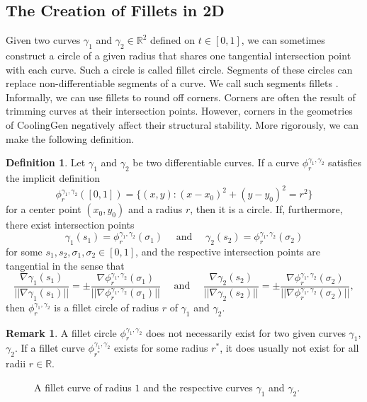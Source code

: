 \documentclass[a4paper, 11pt]{report}
\theoremstyle{definition}
\newtheorem{definition}{Definition}[section]
\newtheorem*{remark}{Remark}
\begin{document}
\subsection{The Creation of Fillets in 2D}\label{sec:filletcurves}
	Given two curves $\gamma_1$ and $\gamma_2 \in \mathbb{R}^2$ defined on $t \in [0,1]$, we can sometimes construct a circle of a given radius that shares one tangential intersection point with each curve. Such a circle is called fillet circle. Segments of these circles can replace non-differentiable segments of a curve. We call such segments fillets \cite{Sorby2016}. Informally, we can use fillets to round off corners. Corners are often the result of trimming curves at their intersection points. However, corners in the geometries of CoolingGen negatively affect their structural stability. More rigorously, we can make the following definition.

	\begin{definition}\label{def:filletcircle}
		Let $\gamma_1$ and $\gamma_2$ be two differentiable curves.
		If a curve $\phi^{\gamma_1, \gamma_2}_r$ satisfies the implicit definition
			$$\phi^{\gamma_1, \gamma_2}_r([0,1]) = \{(x,y) : (x-x_0)^2 + (y-y_0)^2 = r^2\}$$
		for a center point $(x_0, y_0)$ and a radius $r$, then it is a circle. If, furthermore, there exist intersection points
			$$ \gamma_1(s_1) = \phi^{\gamma_1, \gamma_2}_r(\sigma_1) \quad\text{ and }\quad \gamma_2(s_2) = \phi^{\gamma_1, \gamma_2}_r(\sigma_2) $$
		for some $s_1, s_2, \sigma_1, \sigma_2 \in [0,1]$, and the respective intersection points are tangential in the sense that
			$$
				\frac{\nabla \gamma_1(s_1)}{||\nabla \gamma_1(s_1)||} = 
				\pm\frac{\nabla \phi^{\gamma_1, \gamma_2}_r(\sigma_1)}{||\nabla \phi^{\gamma_1, \gamma_2}_r(\sigma_1)||} 
				\quad\text{ and }\quad 
				\frac{\nabla \gamma_2(s_2)}{||\nabla \gamma_2(s_2)||} =  
				\pm\frac{\nabla \phi^{\gamma_1, \gamma_2}_r(\sigma_2)}{||\nabla \phi^{\gamma_1, \gamma_2}_r(\sigma_2)||},
			$$
		then $\phi^{\gamma_1, \gamma_2}_r$ is a fillet circle of radius $r$ of $\gamma_1$ and $\gamma_2$.
	\end{definition}
	\begin{remark}
		A fillet circle $\phi^{\gamma_1, \gamma_2}_r$ does not necessarily exist for two given curves $\gamma_1$, $\gamma_2$. If a fillet 
		curve $\phi^{\gamma_1, \gamma_2}_{r^*}$ exists for some radius $r^*$, it does usually not exist for all radii $r \in \mathbb{R}$.
	\end{remark}

	\begin{figure}[H]
		\centering
		
		\caption{A fillet curve of radius $1$ and the respective curves $\gamma_1$ and $\gamma_2$.}
		\label{fig:verysimplefillet}
	\end{figure}
\end{document}
